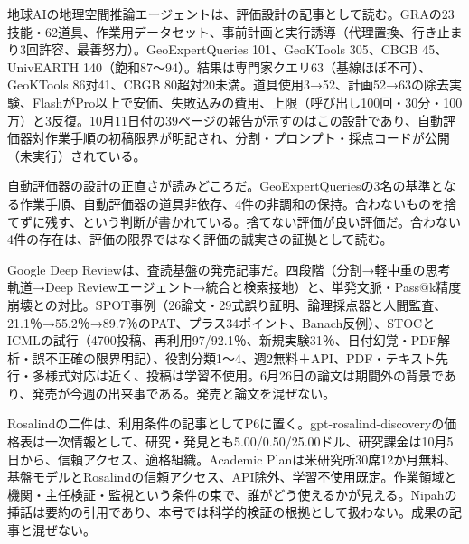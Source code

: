 \documentclass[lualatex,a4paper,10pt]{jlreq}
\begin{document}
地球AIの地理空間推論エージェントは、評価設計の記事として読む。GRAの23技能・62道具、作業用データセット、事前計画と実行誘導（代理置換、行き止まり3回許容、最善努力）。GeoExpertQueries 101、GeoKTools 305、CBGB 45、UnivEARTH 140（飽和87〜94）。結果は専門家クエリ63（基線ほぼ不可）、GeoKTools 86対41、CBGB 80超対20未満。道具使用3→52、計画52→63の除去実験、FlashがPro以上で安価、失敗込みの費用、上限（呼び出し100回・30分・100万）と3反復。10月11日付の39ページの報告が示すのはこの設計であり、自動評価器対作業手順の初稿限界が明記され、分割・プロンプト・採点コードが公開（未実行）されている。

自動評価器の設計の正直さが読みどころだ。GeoExpertQueriesの3名の基準となる作業手順、自動評価器の道具非依存、4件の非調和の保持。合わないものを捨てずに残す、という判断が書かれている。捨てない評価が良い評価だ。合わない4件の存在は、評価の限界ではなく評価の誠実さの証拠として読む。

Google Deep Reviewは、査読基盤の発売記事だ。四段階（分割→軽中重の思考軌道→Deep Reviewエージェント→統合と検索接地）と、単発文脈・Pass@k精度崩壊との対比。SPOT事例（26論文・29式誤り証明、論理採点器と人間監査、21.1％→55.2％→89.7％のPAT、プラス34ポイント、Banach反例）、STOCとICMLの試行（4700投稿、再利用97/92.1％、新規実験31％、日付幻覚・PDF解析・誤不正確の限界明記）、役割分類1〜4、週2無料＋API、PDF・テキスト先行・多様式対応は近く、投稿は学習不使用。6月26日の論文は期間外の背景であり、発売が今週の出来事である。発売と論文を混ぜない。

Rosalindの二件は、利用条件の記事としてP6に置く。gpt-rosalind-discoveryの価格表は一次情報として、研究・発見とも5.00/0.50/25.00ドル、研究課金は10月5日から、信頼アクセス、適格組織。Academic Planは米研究所30席12か月無料、基盤モデルとRosalindの信頼アクセス、API除外、学習不使用既定。作業領域と機関・主任検証・監視という条件の束で、誰がどう使えるかが見える。Nipahの挿話は要約の引用であり、本号では科学的検証の根拠として扱わない。成果の記事と混ぜない。
\end{document}
